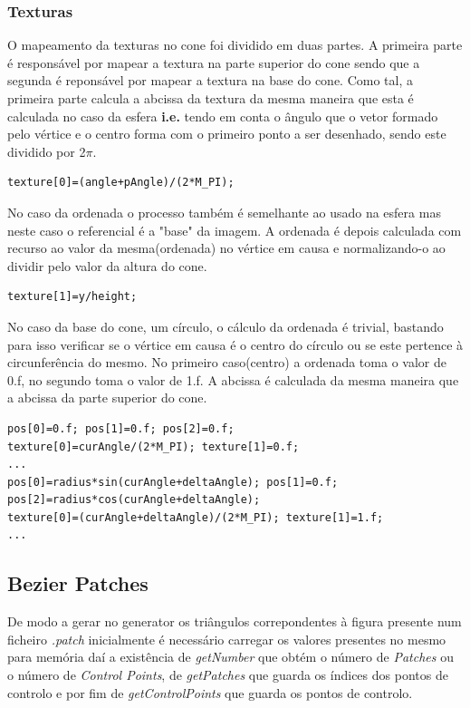 \documentclass{article}
\begin{document}
\subsubsection{Texturas}
O mapeamento da texturas no cone foi dividido em duas partes. 
A primeira parte é responsável por mapear a textura na parte superior do cone sendo que a segunda é reponsável por mapear a textura na base do cone.
Como tal, a primeira parte calcula a abcissa da textura da mesma maneira que esta é calculada no caso da esfera \textbf{i.e.} tendo em conta o ângulo que o vetor formado pelo vértice e o centro forma com o primeiro ponto a ser desenhado, sendo este dividido por 2$\pi$.
\begin{verbatim}
texture[0]=(angle+pAngle)/(2*M_PI);
\end{verbatim}
No caso da ordenada o processo também é semelhante ao usado na esfera mas neste caso o referencial é a "base" da imagem. A ordenada é depois calculada com recurso ao valor da mesma(ordenada) no vértice em causa e normalizando-o ao dividir pelo valor da altura do cone.
\begin{verbatim}
texture[1]=y/height;
\end{verbatim}

No caso da base do cone, um círculo, o cálculo da ordenada é trivial, bastando para isso verificar se o vértice em causa é o centro do círculo ou se este pertence à circunferência do mesmo. No primeiro caso(centro) a ordenada toma o valor de 0.f, no segundo toma o valor de 1.f. A abcissa é calculada da mesma maneira que a abcissa da parte superior do cone.

\begin{verbatim}
pos[0]=0.f; pos[1]=0.f; pos[2]=0.f;
texture[0]=curAngle/(2*M_PI); texture[1]=0.f;
...
pos[0]=radius*sin(curAngle+deltaAngle); pos[1]=0.f; pos[2]=radius*cos(curAngle+deltaAngle);
texture[0]=(curAngle+deltaAngle)/(2*M_PI); texture[1]=1.f;
...
\end{verbatim}


\subsection{Bezier Patches}
De modo a gerar no generator os triângulos correpondentes à figura presente num ficheiro \textit{.patch} inicialmente é necessário carregar os valores presentes no mesmo para memória daí a existência de \textit{getNumber} que obtém o número de \textit{Patches} ou o número de \textit{Control Points}, de \textit{getPatches} que guarda os índices dos pontos de controlo e por fim de \textit{getControlPoints} que guarda os pontos de controlo.
\end{document}
